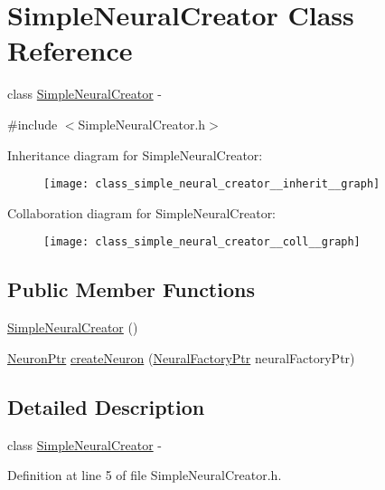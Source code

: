 \hypertarget{class_simple_neural_creator}{
\section{SimpleNeuralCreator Class Reference}
\label{class_simple_neural_creator}
}


class \hyperlink{class_simple_neural_creator}{SimpleNeuralCreator} -\/  




{\ttfamily \#include $<$SimpleNeuralCreator.h$>$}



Inheritance diagram for SimpleNeuralCreator:
\nopagebreak
\begin{figure}[H]
\begin{center}
\leavevmode
\texttt{[image: class\_simple\_neural\_creator\_\_inherit\_\_graph]}
\end{center}
\end{figure}


Collaboration diagram for SimpleNeuralCreator:
\nopagebreak
\begin{figure}[H]
\begin{center}
\leavevmode
\texttt{[image: class\_simple\_neural\_creator\_\_coll\_\_graph]}
\end{center}
\end{figure}
\subsection*{Public Member Functions}
\begin{DoxyCompactItemize}
\item 
\hyperlink{class_simple_neural_creator_adbb88d9250fc4cd85b036039286918bc}{SimpleNeuralCreator} ()
\item 
\hyperlink{_a_m_o_r_e_8h_ac1ea936c2c7728eb382278131652fef4}{NeuronPtr} \hyperlink{class_simple_neural_creator_a9644ba2572c29a119d54c071611a52b2}{createNeuron} (\hyperlink{_a_m_o_r_e_8h_ac4ad88962955479bfc426da9ce4571d2}{NeuralFactoryPtr} neuralFactoryPtr)
\end{DoxyCompactItemize}


\subsection{Detailed Description}
class \hyperlink{class_simple_neural_creator}{SimpleNeuralCreator} -\/ 

Definition at line 5 of file SimpleNeuralCreator.h.




